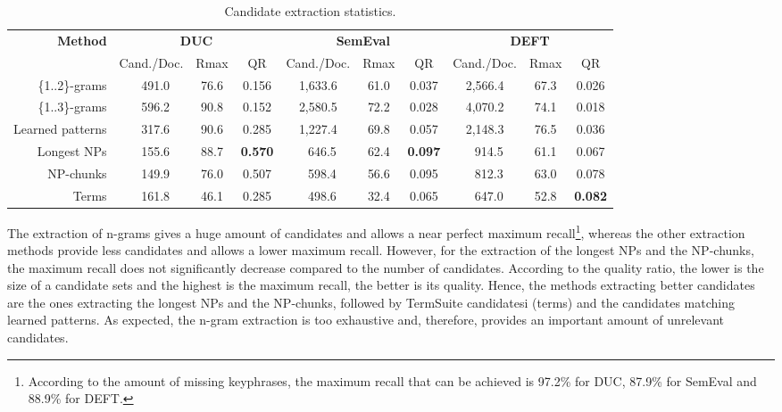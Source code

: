     \begin{table*}
      \centering
      \begin{tabular}{@{~}r@{~~}c@{~~}c@{~~}c@{~~}c@{~~}c@{~~}c@{~~}c@{~~}c@{~~}c@{~}}
        \toprule
        \multirow{2}{*}[-2pt]{\textbf{Method}} & \multicolumn{3}{c}{\textbf{DUC}} & \multicolumn{3}{c}{\textbf{SemEval}} & \multicolumn{3}{c}{\textbf{DEFT}}\\
        \cmidrule(r){2-4}\cmidrule(r){5-7}\cmidrule{8-10}
        & Cand./Doc. & Rmax & QR & Cand./Doc. & Rmax & QR & Cand./Doc. & Rmax &
        QR\\
        \midrule
        \{1..2\}-grams & $~~~$491.0 & 76.6 & 0.156 & 1,633.6 & 61.0 & 0.037 & 2,566.4 & 67.3 & 0.026\\
        \{1..3\}-grams & $~~~$596.2 & 90.8 & 0.152 & 2,580.5 & 72.2 & 0.028 & 4,070.2 & 74.1 & 0.018\\
        Learned patterns & $~~~$317.6 & 90.6 & 0.285 & 1,227.4 & 69.8 & 0.057 & 2,148.3 & 76.5 & 0.036\\
        Longest NPs & $~~~$155.6 & 88.7 & \textbf{0.570} & $~~~$646.5 & 62.4 & \textbf{0.097} & $~~~$914.5 & 61.1 & 0.067\\
        NP-chunks & $~~~$149.9 & 76.0 & 0.507 & $~~~$598.4 & 56.6 & 0.095 & $~~~$812.3 & 63.0 & 0.078\\
        Terms & $~~~$161.8 & 46.1 & 0.285 & $~~~$498.6 & 32.4 & 0.065 & $~~~$647.0 & 52.8 & \textbf{0.082}\\
        \bottomrule
      \end{tabular}
      \caption{Candidate extraction statistics.
               \label{tab:candidate_extraction_statistics}}
    \end{table*}

      The extraction  of n-grams gives a huge amount of candidates and allows a
      near perfect maximum recall\footnote{According to the amount of missing
      keyphrases, the maximum recall that can be achieved is 97.2\% for DUC,
      87.9\% for SemEval and 88.9\% for DEFT.}, whereas the other extraction
      methods provide less candidates and allows a lower maximum recall.
      However, for the extraction of the longest NPs and the NP-chunks, the
      maximum recall does not significantly decrease compared to the number of
      candidates. According to the quality ratio, the lower is the size of a
      candidate sets and the highest is the maximum recall, the better is its
      quality. Hence, the methods extracting better
      candidates are the ones extracting the longest NPs and the NP-chunks,
      followed by TermSuite candidatesi (terms) and the candidates matching
      learned patterns. As expected, the n-gram extraction is too exhaustive
      and, therefore, provides an important amount of unrelevant candidates.
      
